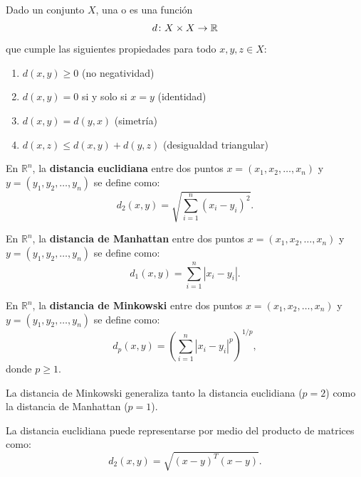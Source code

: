 \documentclass[a4,11pt]{aleph-notas}
\begin{document}
\begin{defi}
    Dado un conjunto $X$, una  o  es una función
    \[
        d\colon X \times X \rightarrow \mathbb{R}
    \]
    que cumple las siguientes propiedades para todo $x, y, z \in X$:
    \begin{enumerate}
        \item $d(x, y) \geq 0$ (no negatividad)
        \item $d(x, y) = 0$ si y solo si $x = y$ (identidad)
        \item $d(x, y) = d(y, x)$ (simetría)
        \item $d(x, z) \leq d(x, y) + d(y, z)$ (desigualdad triangular)
    \end{enumerate}
\end{defi}

\begin{defi}
    En $\mathbb{R}^n$, la \textbf{distancia euclidiana} entre dos puntos $x = (x_1, x_2, \dots, x_n)$ y $y = (y_1, y_2, \dots, y_n)$ se define como:
    \[
        d_2(x, y) = \sqrt{\sum_{i=1}^{n} (x_i - y_i)^2}.
    \]
\end{defi}

\begin{defi}
    En $\mathbb{R}^n$, la \textbf{distancia de Manhattan} entre dos puntos $x = (x_1, x_2, \dots, x_n)$ y $y = (y_1, y_2, \dots, y_n)$ se define como:
    \[
        d_1(x, y) = \sum_{i=1}^{n} |x_i - y_i|.
    \]
\end{defi}

\begin{defi}
    En $\mathbb{R}^n$, la \textbf{distancia de Minkowski} entre dos puntos $x = (x_1, x_2, \dots, x_n)$ y $y = (y_1, y_2, \dots, y_n)$ se define como:
    \[
        d_p(x, y) = \left( \sum_{i=1}^{n} |x_i - y_i|^p \right)^{1/p},
    \]
    donde $p \geq 1$.
\end{defi}

\begin{advertencia}
    La distancia de Minkowski generaliza tanto la distancia euclidiana ($p=2$) como la distancia de Manhattan ($p=1$).
\end{advertencia}

\begin{advertencia}
    La distancia euclidiana puede representarse por medio del producto de matrices como:
    \[
        d_2(x, y) = \sqrt{(x - y)^T (x - y)}.
    \]
\end{advertencia}
\end{document}
